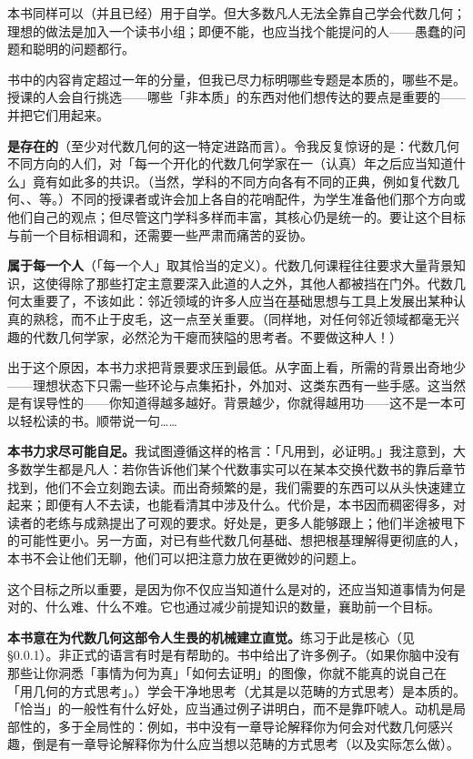 本书同样可以（并且已经）用于自学。但大多数凡人无法全靠自己学会代数几何；理想的做法是加入一个读书小组；即便不能，也应当找个能提问的人——愚蠢的问题和聪明的问题都行。

书中的内容肯定超过一年的分量，但我已尽力标明哪些专题是本质的，哪些不是。授课的人会自行挑选——哪些「非本质」的东西对他们想传达的要点是重要的——并把它们用起来。

\noindent\textbf{\trCanon{}是存在的}（至少对代数几何的这一特定进路而言）。令我反复惊讶的是：代数几何不同方向的人们，对「每一个开化的代数几何学家在一（认真）年之后应当知道什么」竟有如此多的共识。（当然，学科的不同方向各有不同的正典，例如复代数几何、\trCombinatorialAlgGeom、\trComputationalAlgGeom{}等。）不同的授课者或许会加上各自的花哨配件，为学生准备他们那个方向或他们自己的观点；但尽管这门学科多样而丰富，其核心仍是统一的。要让这个目标与前一个目标相调和，还需要一些严肃而痛苦的妥协。

\noindent\textbf{\trAlgebraicGeometry{}属于每一个人}（「每一个人」取其恰当的定义）。代数几何课程往往要求大量背景知识，这使得除了那些打定主意要深入此道的人之外，其他人都被挡在门外。代数几何太重要了，不该如此：邻近领域的许多人应当在基础思想与工具上发展出某种认真的熟稔，而不止于皮毛，这一点至关重要。（同样地，对任何邻近领域都毫无兴趣的代数几何学家，必然沦为干瘪而狭隘的思考者。不要做这种人！）

出于这个原因，本书力求把背景要求压到最低。从字面上看，所需的背景出奇地少——理想状态下只需一些\trCommutative{}环论与点集拓扑，外加对\trPrimeIdeal、\trLocalization{}这类东西有一些手感。这当然是有误导性的——你知道得越多越好。背景越少，你就得越用功——这不是一本可以轻松读的书。顺带说一句……

\noindent\textbf{本书力求尽可能自足。}我试图遵循这样的格言：「凡用到，必证明。」我注意到，大多数学生都是凡人：若你告诉他们某个代数事实可以在某本交换代数书的靠后章节找到，他们不会立刻跑去读。而出奇频繁的是，我们需要的东西可以从头快速建立起来；即便有人不去读，也能看清其中涉及什么。代价是，本书因而稠密得多，对读者的老练与成熟提出了可观的要求。好处是，更多人能够跟上；他们半途被甩下的可能性更小。另一方面，对已有些代数几何基础、想把根基理解得更彻底的人，本书不会让他们无聊，他们可以把注意力放在更微妙的问题上。

这个目标之所以重要，是因为你不仅应当知道什么是对的，还应当知道事情为何是对的、什么难、什么不难。它也通过减少前提知识的数量，襄助前一个目标。

\noindent\textbf{本书意在为代数几何这部令人生畏的机械建立直觉。}练习于此是核心（见 \S0.0.1）。非正式的语言有时是有帮助的。书中给出了许多例子。（如果你脑中没有那些让你洞悉「事情为何为真」「如何去证明」的图像，你就不能真的说自己在「用几何的方式思考」。）学会干净地思考（尤其是以范畴的方式思考）是本质的。「恰当」的一般性有什么好处，应当通过例子讲明白，而不是靠吓唬人。动机是局部性的，多于全局性的：例如，书中没有一章导论解释你为何会对代数几何感兴趣，倒是有一章导论解释你为什么应当想以范畴的方式思考（以及实际怎么做）。

